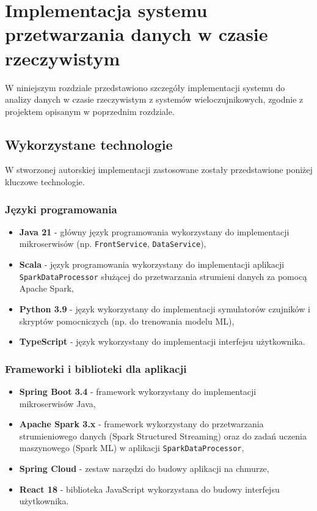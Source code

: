\section{Implementacja systemu przetwarzania danych w czasie rzeczywistym}
\label{sec:implementacja_systemu}

W niniejszym rozdziale przedstawiono szczegóły implementacji systemu do analizy danych w czasie rzeczywistym z systemów wieloczujnikowych,
zgodnie z projektem opisanym w poprzednim rozdziale.

\subsection{Wykorzystane technologie}
\label{subsec:technologie}

W stworzonej autorskiej implementacji zastosowane zostały przedstawione poniżej kluczowe technologie.

\subsubsection{Języki programowania}
\label{subsubsec:jezyki_programowania}

\begin{itemize}
    \item \textbf{Java 21} - główny język programowania wykorzystany do implementacji mikroserwisów (np. \texttt{FrontService}, \texttt{DataService}),
    \item \textbf{Scala} - język programowania wykorzystany do implementacji aplikacji \texttt{SparkDataProcessor} służącej do przetwarzania strumieni danych za pomocą Apache Spark,
    \item \textbf{Python 3.9} - język wykorzystany do implementacji symulatorów czujników i skryptów pomocniczych (np. do trenowania modelu ML),
    \item \textbf{TypeScript} - język wykorzystany do implementacji interfejsu użytkownika.
\end{itemize}

\subsubsection{Frameworki i biblioteki dla aplikacji}
\label{subsubsec:frameworki}

\begin{itemize}
    \item \textbf{Spring Boot 3.4} - framework wykorzystany do implementacji mikroserwisów Java,
    \item \textbf{Apache Spark 3.x} \cite{spark_streaming} - framework wykorzystany do przetwarzania strumieniowego danych (Spark Structured Streaming) oraz do zadań uczenia maszynowego (Spark ML) w aplikacji \texttt{SparkDataProcessor},
    \item \textbf{Spring Cloud} - zestaw narzędzi do budowy aplikacji na chmurze,
    \item \textbf{React 18} - biblioteka JavaScript wykorzystana do budowy interfejsu użytkownika.
\end{itemize}


